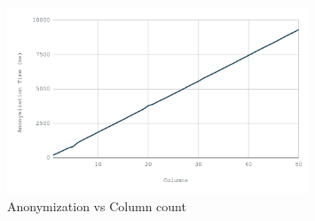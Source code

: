 \begin{figure}[H]
    \centering
    \includegraphics[width=0.8\textwidth]{images/anon-columns.png}
    \caption{Anonymization vs Column count}\label{fig:anon_columns}
\end{figure}